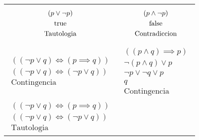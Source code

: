 \documentclass[10pt,a4paper,2in]{article}
\begin{document}
\begin{tabularx}{\linewidth}{X|X}
    \begin{equation}
        \begin{gathered}
            (p\lor \lnot p)\\
            \mathrm{true}\\
            \text{Tautologia}
        \end{gathered}
    \end{equation}
    &
    \begin{equation}
        \begin{gathered}
            (p \land \lnot p)\\
            \mathrm{false}\\
            \text{Contradiccion}
        \end{gathered}
    \end{equation}\\
    \begin{equation}
        \begin{gathered}
            ((\lnot p \lor q) \iff (p\implies q))\\
            ((\lnot p \lor q) \iff (\lnot p\lor q))\\
            \text{Contingencia}
        \end{gathered}
    \end{equation}
    &
    \begin{equation}
        \begin{gathered}
            ((p\land q)\implies p)\\
            \lnot(p\land q)\lor p\\
            \lnot p \lor \lnot q \lor p\\
            q\\
            \text{Contingencia}
        \end{gathered}
    \end{equation}\\
    \begin{equation}
        \begin{gathered}
            ((\lnot p \lor q)\iff (p\implies q))\\
            ((\lnot p \lor q)\iff (\lnot p \lor q))\\
            \text{Tautologia}
        \end{gathered}
    \end{equation}
    &
    \begin{equation}
        \begin{gathered}

\end{gathered}
\end{equation}
\end{tabularx}
\end{document}
